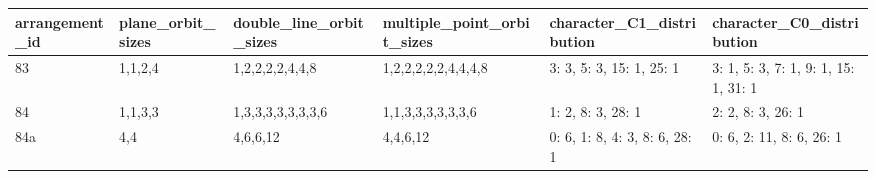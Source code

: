 \begin{tabular}{llllll}
\toprule
arrangement_id & plane_orbit_sizes & double_line_orbit_sizes & multiple_point_orbit_sizes & character_C1_distribution & character_C0_distribution \\
\midrule
83 & 1,1,2,4 & 1,2,2,2,2,4,4,8 & 1,2,2,2,2,2,4,4,4,8 & {3: 3, 5: 3, 15: 1, 25: 1} & {3: 1, 5: 3, 7: 1, 9: 1, 15: 1, 31: 1} \\
84 & 1,1,3,3 & 1,3,3,3,3,3,3,3,6 & 1,1,3,3,3,3,3,3,6 & {1: 2, 8: 3, 28: 1} & {2: 2, 8: 3, 26: 1} \\
84a & 4,4 & 4,6,6,12 & 4,4,6,12 & {0: 6, 1: 8, 4: 3, 8: 6, 28: 1} & {0: 6, 2: 11, 8: 6, 26: 1} \\
\bottomrule
\end{tabular}
